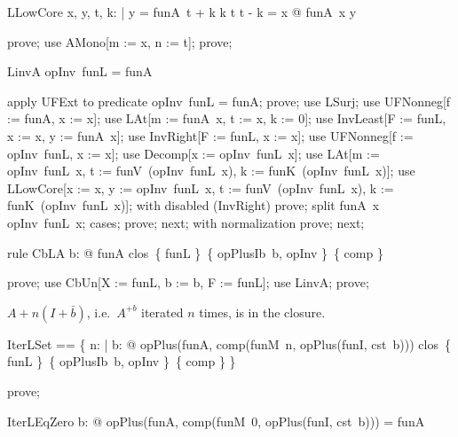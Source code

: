 \documentclass{article}
\begin{document}
\begin{theorem}{LLowCore}
  \forall x, y, t, k: \nat | y = funA~t + k \land k \leq t \land t - k = x @ funA~x \leq y
\end{theorem}

\begin{zproof}
prove;
use AMono[m := x, n := t];
prove;
\end{zproof}

\begin{theorem}{LinvA}
  opInv~funL = funA
\end{theorem}

\begin{zproof}
apply UFExt to predicate opInv~funL = funA;
prove;
use LSurj;
use UFNonneg[f := funA, x := x];
use LAt[m := funA~x, t := x, k := 0];
use InvLeast[F := funL, x := x, y := funA~x];
use InvRight[F := funL, x := x];
use UFNonneg[f := opInv~funL, x := x];
use Decomp[x := opInv~funL~x];
use LAt[m := opInv~funL~x, t := funV~(opInv~funL~x), k := funK~(opInv~funL~x)];
use LLowCore[x := x, y := opInv~funL~x, t := funV~(opInv~funL~x), k := funK~(opInv~funL~x)];
with disabled (InvRight) prove;
split funA~x \leq opInv~funL~x;
cases;
prove;
next;
with normalization prove;
next;
\end{zproof}

\begin{theorem}{rule CbLA}
  \forall b: \nat @ funA \in clos~\{ funL \}~\{ opPlusIb~b, opInv \}~\{ comp \}
\end{theorem}

\begin{zproof}
prove;
use CbUn[X := funL, b := b, F := funL];
use LinvA;
prove;
\end{zproof}

$A + n(I + \bar b)$, i.e.\ $A^{+b}$ iterated $n$ times, is in the closure.

\begin{zed}
  IterLSet == \{ n: \nat | \forall b: \nat @ opPlus(funA, comp(funM~n, opPlus(funI, cst~b))) \in clos~\{ funL \}~\{ opPlusIb~b, opInv \}~\{ comp \} \}
\end{zed}

\begin{zproof}
prove;
\end{zproof}

\begin{theorem}{IterLEqZero}
  \forall b: \nat @ opPlus(funA, comp(funM~0, opPlus(funI, cst~b))) = funA
\end{theorem}
\end{document}
